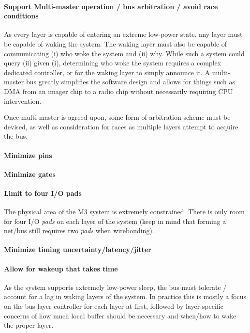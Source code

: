 \paragraph{Support Multi-master operation / bus arbitration / avoid race
conditions}
As every layer is capable of entering an extreme low-power state, any layer
must be capable of waking the system. The waking layer must also be capable of
communicating (i) who woke the system and (ii) why. While such a system could
query (ii) given (i), determining who woke the system requires a complex
dedicated controller, or for the waking layer to simply announce it. A
multi-master bus greatly simplifies the software design and allows for things
such as DMA from an imager chip to a radio chip without necessarily requiring
CPU intervention.

Once multi-master is agreed upon, some form of arbitration scheme must be
devised, as well as consideration for races as multiple layers attempt to
acquire the bus.

\paragraph{Minimize pins}
\paragraph{Minimize gates}
\paragraph{Limit to four I/O pads}
The physical area of the M3 system is extremely constrained. There is only
room for four I/O {\em pads} on each layer of the system (keep in mind that
forming a net/bus still requires two {\em pads} when wirebonding).

\paragraph{Minimize timing uncertainty/latency/jitter}

\paragraph{Allow for wakeup that takes time}
As the system supports extremely low-power sleep, the bus must tolerate /
account for a lag in waking layers of the system. In practice this is
mostly a focus on the bus layer controller for each layer at first, followed
by layer-specific concerns of how much local buffer should be necessary and
when/how to wake the proper layer.

